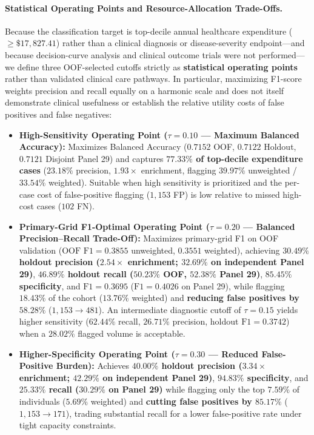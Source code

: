 \documentclass[runningheads]{llncs}
\begin{document}
\paragraph{Statistical Operating Points and Resource-Allocation Trade-Offs.}
Because the classification target is top-decile annual healthcare expenditure ($\ge \$17,827.41$) rather than a clinical diagnosis or disease-severity endpoint---and because decision-curve analysis and clinical outcome trials were not performed---we define three OOF-selected cutoffs strictly as \textbf{statistical operating points} rather than validated clinical care pathways. In particular, maximizing F1-score weights precision and recall equally on a harmonic scale and does not itself demonstrate clinical usefulness or establish the relative utility costs of false positives and false negatives:
\begin{itemize}
    \item \textbf{High-Sensitivity Operating Point ($\tau = 0.10$ --- Maximum Balanced Accuracy):} Maximizes Balanced Accuracy ($0.7152$ OOF, $0.7122$ Holdout, $0.7121$ Disjoint Panel 29) and captures \textbf{$77.33\%$ of top-decile expenditure cases} ($23.18\%$ precision, $1.93\times$ enrichment, flagging $39.97\%$ unweighted / $33.54\%$ weighted). Suitable when high sensitivity is prioritized and the per-case cost of false-positive flagging ($1,153$ FP) is low relative to missed high-cost cases ($102$ FN).
    \item \textbf{Primary-Grid F1-Optimal Operating Point ($\tau = 0.20$ --- Balanced Precision--Recall Trade-Off):} Maximizes primary-grid F1 on OOF validation ($\text{OOF F1} = 0.3855$ unweighted, $0.3551$ weighted), achieving \textbf{$30.49\%$ holdout precision ($2.54\times$ enrichment; $32.69\%$ on independent Panel 29)}, \textbf{$46.89\%$ holdout recall ($50.23\%$ OOF, $52.38\%$ Panel 29)}, \textbf{$85.45\%$ specificity}, and \textbf{$\text{F1} = 0.3695$} ($\text{F1} = 0.4026$ on Panel 29), while flagging $18.43\%$ of the cohort ($13.76\%$ weighted) and \textbf{reducing false positives by $58.28\%$} ($1,153 \to 481$). An intermediate diagnostic cutoff of $\tau = 0.15$ yields higher sensitivity ($62.44\%$ recall, $26.71\%$ precision, holdout $\text{F1} = 0.3742$) when a $28.02\%$ flagged volume is acceptable.
    \item \textbf{Higher-Specificity Operating Point ($\tau = 0.30$ --- Reduced False-Positive Burden):} Achieves \textbf{$40.00\%$ holdout precision ($3.34\times$ enrichment; $42.29\%$ on independent Panel 29)}, \textbf{$94.83\%$ specificity}, and \textbf{$25.33\%$ recall ($30.29\%$ on Panel 29)} while flagging only the top \textbf{$7.59\%$} of individuals ($5.69\%$ weighted) and \textbf{cutting false positives by $85.17\%$} ($1,153 \to 171$), trading substantial recall for a lower false-positive rate under tight capacity constraints.
\end{itemize}
\end{document}
